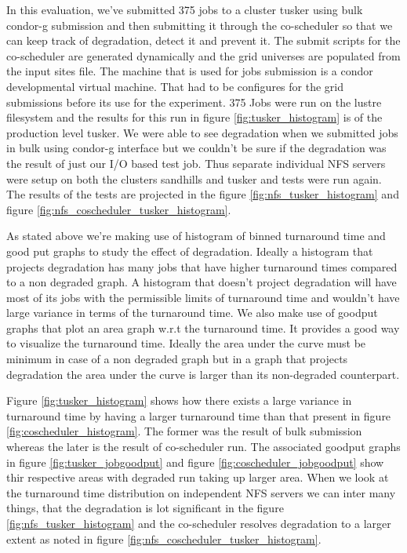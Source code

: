 \documentclass[ms,electronic,double]{nuthesis}
\begin{document}
In this evaluation, we've submitted 375 jobs to a cluster tusker using bulk 
condor-g submission and then submitting it through the co-scheduler so that we 
can keep track of degradation, detect it and prevent it. The submit scripts for 
the co-scheduler are generated dynamically and the grid universes are populated 
from the input sites file. The machine that is used for jobs submission is a 
condor developmental virtual machine. That had to be configures for the grid 
submissions before its use for the experiment. 375 Jobs were run on the lustre 
filesystem and the results for this run in figure \ref{fig:tusker_histogram} is 
of the production level tusker. We were able to see degradation when we 
submitted jobs in bulk using condor-g interface but we couldn't be sure if the 
degradation was the result of just our I/O based test job. Thus separate 
individual NFS servers were setup on both the clusters sandhills and tusker and 
tests were run again. The results of the tests are projected in the figure \ref{fig:nfs_tusker_histogram} 
and figure \ref{fig:nfs_coscheduler_tusker_histogram}.

As stated above we're making use of histogram of binned turnaround time and good 
put graphs to study the effect of degradation. Ideally a histogram that projects 
degradation has many jobs that have higher turnaround times compared to a non 
degraded graph. A histogram that doesn't project degradation will have most of 
its jobs with the permissible limits of turnaround time and wouldn't have large 
variance in terms of the turnaround time. We also make use of goodput graphs 
that plot an area graph w.r.t the turnaround time. It provides a good way to 
visualize the turnaround time. Ideally the area under the curve must be minimum 
in case of a non degraded graph but in a graph that projects degradation the 
area under the curve is larger than its non-degraded counterpart.

Figure \ref{fig:tusker_histogram} shows how there exists a large variance in 
turnaround time by having a larger turnaround time than that present in figure 
\ref{fig:coscheduler_histogram}. The former was the result of bulk submission 
whereas the later is the result of co-scheduler run. The associated goodput 
graphs in figure \ref{fig:tusker_jobgoodput} and figure \ref{fig:coscheduler_jobgoodput} 
show thir respective areas with degraded run taking up larger area. When we look 
at the turnaround time distribution on independent NFS servers we can inter many 
things, that the degradation is lot significant in the figure \ref{fig:nfs_tusker_histogram} and the co-scheduler 
resolves degradation to a larger extent as noted in figure 
\ref{fig:nfs_coscheduler_tusker_histogram}.
\end{document}
